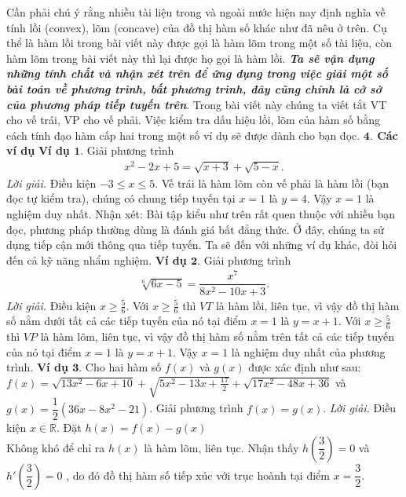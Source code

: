 \begin{multicols}{2}
\begin{center}
\begin{tikzpicture}
		\end{tikzpicture}
	\end{center}
	Cần phải chú ý rằng nhiều tài liệu trong và ngoài nước hiện nay định nghĩa về tính lồi (convex), lõm (concave) của đồ thị hàm số khác như đã nêu ở trên. Cụ thể là hàm lồi trong bài viết này được gọi là hàm lõm trong một số tài liệu, còn hàm lõm trong bài viết này thì lại được họ gọi là hàm lồi. 
	\vskip 0.1cm
	\textit{\textbf{\color{diendantoanhoc}Ta sẽ vận dụng những tính chất và nhận xét trên để ứng dụng trong việc giải một số bài toán về phương trình, bất phương trình, đây cũng chính là cở sở của phương pháp tiếp tuyến trên}}.
	\vskip 0.1cm
	Trong bài viết này chúng ta viết tắt VT cho vế trái, VP cho vế phải.
	Việc kiểm tra dấu hiệu lồi, lõm của hàm số bằng cách tính đạo hàm cấp hai trong một số ví dụ sẽ được dành cho bạn đọc.
	\vskip 0.1cm
	\textbf{\color{diendantoanhoc}$\pmb{4.}$ Các ví dụ}
	\vskip 0.1cm
	\textbf{\color{diendantoanhoc}Ví dụ $\pmb{1.}$} Giải phương trình
	\begin{align*}
		x^2-2x+5=\sqrt{x+3}+\sqrt{5-x}.
	\end{align*}
	\textit{Lời giải.} Điều kiện $-3\leq x\leq 5$. Vế trái là hàm lõm còn vế phải là hàm lồi (bạn đọc tự kiểm tra), chúng có chung tiếp tuyến tại $x=1$ là $y=4$. Vậy $x=1$ là nghiệm duy nhất.
	\vskip 0.1cm
	Nhận xét: Bài tập kiểu như trên rất quen thuộc với nhiều bạn đọc, phương pháp thường dùng là đánh giá bất đẳng thức. Ở đây, chúng ta sử dụng tiếp cận mới thông qua tiếp tuyến.
	\vskip 0.1cm
	Ta sẽ đến với những ví dụ khác, đòi hỏi đến cả kỹ năng nhẩm nghiệm.
	\vskip 0.1cm
	\textbf{\color{diendantoanhoc}Ví dụ $\pmb{2.}$} Giải phương trình
	\begin{align*}
		\sqrt[6]{6x-5}=\dfrac{x^{7}}{8x^{2}-10x+3}.
	\end{align*}
	\textit{Lời giải.} Điều kiện $x\ge \frac{5}{6}$. Với $x\ge \frac{5}{6}$ thì $VT$ là hàm lồi, liên tục, vì vậy đồ thị hàm số nằm dưới tất cả các tiếp tuyến của nó tại điểm $x=1$ là $y=x+1$.
	Với $x\ge\frac{5}{6}$ thì $VP$ là hàm lõm, liên tục, vì vậy đồ thị hàm số nằm trên tất cả các tiếp tuyến của nó tại điểm $x=1$ là $y=x+1$.
	\vskip 0.1cm
	Vậy $x=1$ là nghiệm duy nhất của phương trình. 
	\vskip 0.1cm
	\textbf{\color{diendantoanhoc}Ví dụ $\pmb{3.}$} Cho hai hàm số $f(x)$ và $g(x)$ được xác định như sau: $f(x)=\sqrt{13x^{2} - 6x + 10 } + \sqrt{5x^{2} -13x + \frac{17}{2}} + \sqrt{17x^{2} - 48x + 36} $ và $g(x)= \dfrac{1}{2}(36x - 8x^{2} - 21)$.
	\vskip 0.1cm
	Giải phương trình $f(x)=g(x)$.
	\vskip 0.1cm
	\textit{Lời giải.} Điều kiện $x\in \mathbb R$. Đặt $h(x)=f(x)-g(x)$\\ Không khó để chỉ ra $h(x)$ là hàm lõm, liên tục. Nhận thấy $h(\dfrac{3}{2})=0$ và $h'(\dfrac 32)=0$ , do đó đồ thị hàm số tiếp xúc với trục hoành tại điểm $x=\dfrac{3}{2}$.

\end{multicols}
